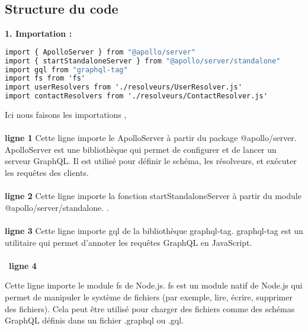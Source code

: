 \documentclass{article}
\begin{document}
\begin{tcolorbox}[
    title={\faCode\ Explication du contenu de \textbf{index.js} },
    colback=blue!5!white,
    colframe=blue!75!black,
    width=\dimexpr\textwidth+3cm\relax, %
    enlarge left by=-1.5cm,            %
    enlarge right by=-1.5cm,           %
    height fixed for=all,              %
    enlarge top initially by=5mm,      %
    enlarge bottom finally by=5mm,     %
    breakable,
    enhanced jigsaw,
    beforeafter skip=15pt,             %
    boxsep=10pt,                       %
    left=15pt,                         %
    right=15pt                         %
]

\section*{Structure du code}
\textbf{1. Importation :}
\begin{lstlisting}[language=GraphQL,basicstyle=\ttfamily\small]
import { ApolloServer } from "@apollo/server"
import { startStandaloneServer } from "@apollo/server/standalone"
import gql from "graphql-tag"
import fs from 'fs'
import userResolvers from './resolveurs/UserResolver.js'
import contactResolvers from './resolveurs/ContactResolver.js'
\end{lstlisting}
Ici nous faisons les importations , \\\\
\textbf{ligne 1}
Cette ligne importe le ApolloServer à partir du package @apollo/server. ApolloServer est une bibliothèque qui permet de configurer et de lancer un serveur GraphQL. Il est utilisé pour définir le schéma, les résolveurs, et exécuter les requêtes des clients.\\\\
\textbf{ligne 2}
Cette ligne importe la fonction startStandaloneServer à partir du module @apollo/server/standalone. .\\\\
\textbf{ligne 3}
Cette ligne importe gql de la bibliothèque graphql-tag. graphql-tag est un utilitaire qui permet d'annoter les requêtes GraphQL en JavaScript. \\\\\
\textbf{ligne 4}

Cette ligne importe le module fs de Node.js. fs est un module natif de Node.js qui permet de manipuler le système de fichiers (par exemple, lire, écrire, supprimer des fichiers). Cela peut être utilisé pour charger des fichiers comme des schémas GraphQL définis dans un fichier .graphql ou .gql.\\\\


\end{tcolorbox}
\end{document}
